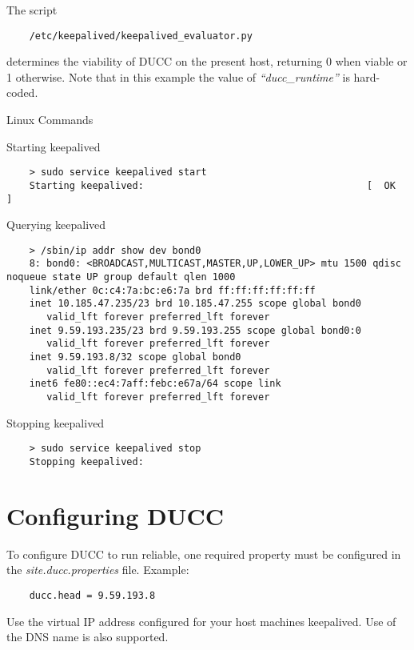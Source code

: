 	\medskip
   	The script 
   	\begin{verbatim}
    /etc/keepalived/keepalived_evaluator.py
   	\end{verbatim}
   	determines the viability of DUCC on the present host, returning 0 when viable or 1 otherwise.
   	Note that in this example the value of {\em ``ducc\_runtime''} is hard-coded.
 
	Linux Commands
	
	Starting keepalived
	
    \begin{verbatim}
    > sudo service keepalived start
    Starting keepalived:                                       [  OK  ]
   	\end{verbatim}
   	
   	Querying keepalived
	
    \begin{verbatim}
    > /sbin/ip addr show dev bond0
    8: bond0: <BROADCAST,MULTICAST,MASTER,UP,LOWER_UP> mtu 1500 qdisc noqueue state UP group default qlen 1000
    link/ether 0c:c4:7a:bc:e6:7a brd ff:ff:ff:ff:ff:ff
    inet 10.185.47.235/23 brd 10.185.47.255 scope global bond0
       valid_lft forever preferred_lft forever
    inet 9.59.193.235/23 brd 9.59.193.255 scope global bond0:0
       valid_lft forever preferred_lft forever
    inet 9.59.193.8/32 scope global bond0
       valid_lft forever preferred_lft forever
    inet6 fe80::ec4:7aff:febc:e67a/64 scope link 
       valid_lft forever preferred_lft forever
   	\end{verbatim}

	Stopping keepalived
	
    \begin{verbatim}
    > sudo service keepalived stop
    Stopping keepalived: 
   	\end{verbatim}

\section{Configuring DUCC}  
    To configure DUCC to run reliable, one required property must
    be configured in the {\em site.ducc.properties} file.  Example:
    
    \begin{verbatim}
	ducc.head = 9.59.193.8
   	\end{verbatim}
    
    Use the virtual IP address configured for your host machines keepalived. 
    Use of the DNS name is also supported. 
    
